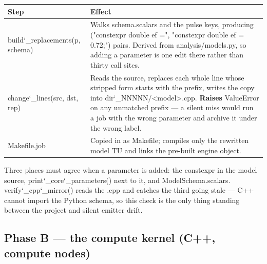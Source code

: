 \documentclass[11pt,a4paper]{article}
\newcommand{\code}[1]{{\ttfamily #1}}
\newcommand{\brk}{\discretionary{}{}{}}
\newcommand{\uu}{\char`_\brk}
\newcommand{\fn}[1]{{\ttfamily #1}}
\begin{document}
\begin{center}
\scriptsize
\begin{tabular}{@{}L{0.30\textwidth} L{0.62\textwidth}@{}}
\toprule
\textbf{Step} & \textbf{Effect} \\
\midrule
\fn{build\uu replacements(p, schema)} & Walks \fn{schema.scalars} and the pulse keys, producing
   \code{("constexpr double ef =", "constexpr double ef = 0.72;")} pairs.
   Derived from \code{analysis/models.py}, so adding a parameter is one edit there rather than thirty call sites. \\
\fn{change\uu lines(src, dst, rep)} & Reads the source, replaces each whole line whose stripped form starts with the prefix, writes the copy into \code{dir\uu NNNNN/<model>.cpp}.
   \textbf{Raises} \fn{ValueError} on any unmatched prefix --- a silent miss would run a job with the wrong parameter and archive it under the wrong label. \\
\code{Makefile.job} & Copied in as \code{Makefile}; compiles only the rewritten model TU and links the pre-built engine object. \\
\bottomrule
\end{tabular}
\end{center}

\begin{sloppypar}
\noindent Three places must agree when a parameter is added: the \fn{constexpr}
in the model source, \fn{print\uu core\uu parameters()} next to it, and
\fn{ModelSchema.scalars}. \fn{verify\uu cpp\uu mirror()} reads the \code{.cpp}
and catches the third going stale --- C++ cannot import the Python schema, so
this check is the only thing standing between the project and silent emitter
drift.
\end{sloppypar}

\subsection{Phase B --- the compute kernel (C++, compute nodes)}
\end{document}
